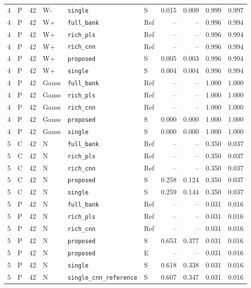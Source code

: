 \documentclass[10pt,a4paper]{article}
\begin{document}
\begin{longtable}{rlrlllrrrr}
4 & P & 42 & W- & \texttt{single} & S & 0.015 & 0.009 & 0.999 & 0.997 \\
4 & P & 42 & W+ & \texttt{full\_bank} & Ref & -- & -- & 0.996 & 0.994 \\
4 & P & 42 & W+ & \texttt{rich\_pls} & Ref & -- & -- & 0.996 & 0.994 \\
4 & P & 42 & W+ & \texttt{rich\_cnn} & Ref & -- & -- & 0.996 & 0.994 \\
4 & P & 42 & W+ & \texttt{proposed} & S & 0.005 & 0.003 & 0.996 & 0.994 \\
4 & P & 42 & W+ & \texttt{single} & S & 0.004 & 0.004 & 0.996 & 0.994 \\
4 & P & 42 & Gauss & \texttt{full\_bank} & Ref & -- & -- & 1.000 & 1.000 \\
4 & P & 42 & Gauss & \texttt{rich\_pls} & Ref & -- & -- & 1.000 & 1.000 \\
4 & P & 42 & Gauss & \texttt{rich\_cnn} & Ref & -- & -- & 1.000 & 1.000 \\
4 & P & 42 & Gauss & \texttt{proposed} & S & 0.000 & 0.000 & 1.000 & 1.000 \\
4 & P & 42 & Gauss & \texttt{single} & S & 0.000 & 0.000 & 1.000 & 1.000 \\
5 & C & 42 & N & \texttt{full\_bank} & Ref & -- & -- & 0.350 & 0.037 \\
5 & C & 42 & N & \texttt{rich\_pls} & Ref & -- & -- & 0.350 & 0.037 \\
5 & C & 42 & N & \texttt{rich\_cnn} & Ref & -- & -- & 0.350 & 0.037 \\
5 & C & 42 & N & \texttt{proposed} & S & 0.258 & 0.124 & 0.350 & 0.037 \\
5 & C & 42 & N & \texttt{single} & S & 0.259 & 0.144 & 0.350 & 0.037 \\
5 & P & 42 & N & \texttt{full\_bank} & Ref & -- & -- & 0.031 & 0.016 \\
5 & P & 42 & N & \texttt{rich\_pls} & Ref & -- & -- & 0.031 & 0.016 \\
5 & P & 42 & N & \texttt{rich\_cnn} & Ref & -- & -- & 0.031 & 0.016 \\
5 & P & 42 & N & \texttt{proposed} & S & 0.653 & 0.377 & 0.031 & 0.016 \\
5 & P & 42 & N & \texttt{proposed} & E & -- & -- & 0.031 & 0.016 \\
5 & P & 42 & N & \texttt{single} & S & 0.618 & 0.338 & 0.031 & 0.016 \\
5 & P & 42 & N & \texttt{single\_cnn\_reference} & S & 0.607 & 0.347 & 0.031 & 0.016 \\

\end{longtable}
\end{document}
